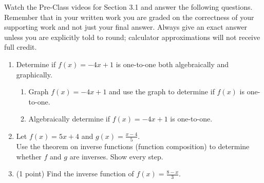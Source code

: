 


\noindent Watch the Pre-Class videos for Section 3.1 and answer the following questions. Remember that in your written work you are graded on the correctness of your supporting work and not just your final answer. Always give an exact answer unless you are explicitly told to round; calculator approximations will not receive full credit.


\begin{enumerate}

\item  Determine if $f(x)=-4x+1$ is one-to-one both algebraically and graphically.
\begin{enumerate}

\item  Graph $f(x)=-4x+1$ and use the graph to determine if $f(x)$ is one-to-one.




\item  Algebraically determine if $f(x)=-4x+1$ is one-to-one.

\vfill


\end{enumerate}



\vfill
\newpage

\item   Let $f(x)=5x+4$ and $\displaystyle g(x)=\frac{x-4}{5}$.\\
Use the theorem on inverse functions (function composition) to determine whether $f$ and $g$ are inverses.  Show every step.
\vfill


\item (1 point) Find the inverse function of $\displaystyle f(x)=\frac{8-x}{3}$.
\vfill




\end{enumerate}



